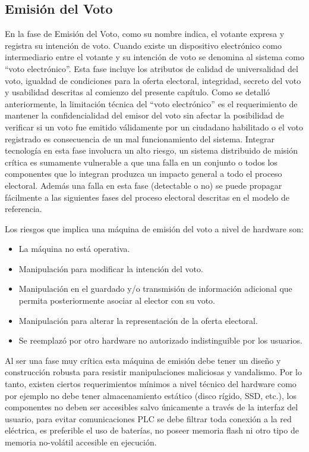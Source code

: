 \subsection{Emisión del Voto} 
En la fase de Emisión del Voto, como su nombre indica, el votante expresa y registra su intención de voto. Cuando existe un dispositivo electrónico como intermediario entre el votante y su intención de voto se denomina al sistema como ``voto electrónico''. Esta fase incluye los atributos de calidad de universalidad del voto, igualdad de condiciones para la oferta electoral, integridad, secreto del voto y usabilidad descritas al comienzo del presente capítulo. Como se detalló anteriormente, la limitación técnica del ``voto electrónico'' es el requerimiento de mantener la confidencialidad del emisor del voto sin afectar la posibilidad de verificar si un voto fue emitido válidamente por un ciudadano habilitado o el voto registrado es consecuencia de un mal funcionamiento del sistema. Integrar tecnología en esta fase involucra un alto riesgo, un sistema distribuido de misión crítica es sumamente vulnerable a que una falla en un conjunto o todos los componentes que lo integran produzca un impacto general a todo el proceso electoral. Además una falla en esta fase (detectable o no) se puede propagar fácilmente a las siguientes fases del proceso electoral descritas en el modelo de referencia. 

Los riesgos que implica una máquina de emisión del voto a nivel de hardware son:
\begin{itemize}
    \item La máquina no está operativa.
    \item Manipulación para modificar la intención del voto.
    \item Manipulación en el guardado y/o transmisión de información adicional que permita posteriormente asociar al elector con su voto.
    \item Manipulación para alterar la representación de la oferta electoral.
    \item Se reemplazó por otro hardware no autorizado indistinguible por los usuarios.
\end{itemize}
Al ser una fase muy crítica esta máquina de emisión debe tener un diseño y construcción robusta para resistir manipulaciones maliciosas y vandalismo. Por lo tanto, existen ciertos requerimientos mínimos a nivel técnico del hardware como por ejemplo no debe tener almacenamiento estático (disco rígido, SSD, etc.), los componentes no deben ser accesibles salvo únicamente a través de la interfaz del usuario, para evitar comunicaciones PLC se debe filtrar toda conexión a la red eléctrica, es preferible el uso de baterías, no poseer memoria flash ni otro tipo de memoria no-volátil accesible en ejecución. \cite{conicet}


